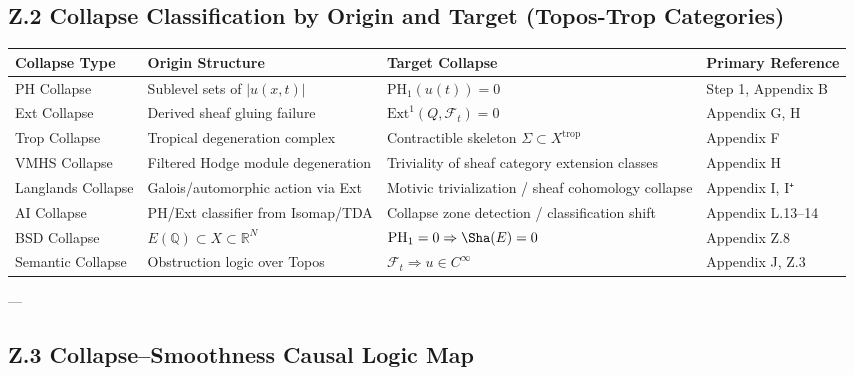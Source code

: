 \documentclass[11pt]{article}
\begin{document}
\begin{axiom}
\begin{axiom}
{{\subsection*{Z.2 Collapse Classification by Origin and Target (Topos-Trop Categories)}

\begin{tabular}{>{\raggedright\arraybackslash}p{3.2cm} >{\raggedright\arraybackslash}p{4.0cm} >{\raggedright\arraybackslash}p{4.0cm} >{\raggedright\arraybackslash}p{2.5cm}}
\toprule
\textbf{Collapse Type} & \textbf{Origin Structure} & \textbf{Target Collapse} & \textbf{Primary Reference} \\
\midrule
PH Collapse & Sublevel sets of \( |u(x,t)| \) & \( \mathrm{PH}_1(u(t)) = 0 \) & Step 1, Appendix B \\
Ext Collapse & Derived sheaf gluing failure & \( \mathrm{Ext}^1(Q, \mathcal{F}_t) = 0 \) & Appendix G, H \\
Trop Collapse & Tropical degeneration complex & Contractible skeleton \( \Sigma \subset X^{\text{trop}} \) & Appendix F \\
VMHS Collapse & Filtered Hodge module degeneration & Triviality of sheaf category extension classes & Appendix H \\
Langlands Collapse & Galois/automorphic action via Ext & Motivic trivialization / sheaf cohomology collapse & Appendix I, I⁺ \\
AI Collapse & PH/Ext classifier from Isomap/TDA & Collapse zone detection / classification shift & Appendix L.13–14 \\
BSD Collapse & \( E(\mathbb{Q}) \subset X \subset \mathbb{R}^N \) & \( \mathrm{PH}_1 = 0 \Rightarrow \Sha(E) = 0 \) & Appendix Z.8 \\
Semantic Collapse & Obstruction logic over Topos & \( \mathcal{F}_t \Rightarrow u \in C^\infty \) & Appendix J, Z.3 \\
\bottomrule
\end{tabular}

---

\subsection*{Z.3 Collapse–Smoothness Causal Logic Map}

\begin{center}
\end{center}

}}
\end{axiom}
\end{axiom}
\end{document}
